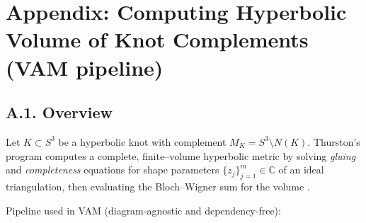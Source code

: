 \documentclass[10pt,reprint,aps,onecolumn,nofootinbib]{revtex4-2}
\begin{document}
    \section*{Appendix: Computing Hyperbolic Volume of Knot Complements (VAM pipeline)}

    \subsection*{A.1. Overview}
        Let \(K\subset S^3\) be a hyperbolic knot with complement \(M_K = S^3\setminus N(K)\).
        Thurston’s program computes a complete, finite–volume hyperbolic metric by solving \emph{gluing} and \emph{completeness} equations for shape parameters \(\{z_j\}_{j=1}^m\in\mathbb{C}\) of an ideal triangulation, then evaluating the Bloch–Wigner sum for the volume \cite{ThurstonNotes,NeumannZagier1985,AdamsWeeks1992}.

        Pipeline used in VAM (diagram‐agnostic and dependency-free):
\end{document}
